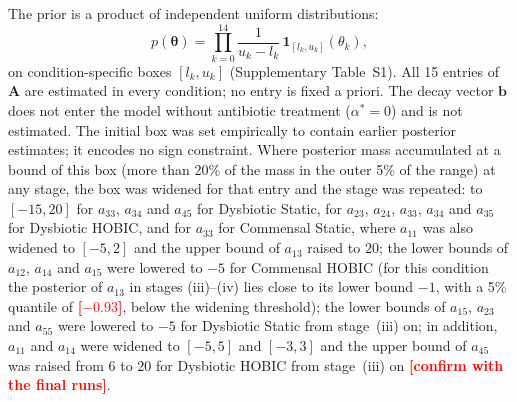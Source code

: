 \documentclass[pdflatex,sn-mathphys-ay,lineno]{sn-jnl}%
\newcommand{\btheta}{\boldsymbol{\theta}}
\newcommand{\TBD}[1]{\textcolor{red}{\textbf{[#1]}}}
\begin{document}
The prior is a product of independent uniform distributions:
\begin{equation}
p(\btheta) = \prod_{k=0}^{14} \frac{1}{u_k-l_k}\,\mathbf{1}_{[l_k,u_k]}(\theta_k),
\label{eq:prior}
\end{equation}
on condition-specific boxes $[l_k,u_k]$ (Supplementary Table~S1).
All 15 entries of $\mathbf{A}$ are estimated in every condition; no entry is fixed a priori.
The decay vector $\mathbf{b}$ does not enter the model without antibiotic treatment ($\alpha^*=0$) and is not estimated.
The initial box was set empirically to contain earlier posterior estimates; it encodes no sign constraint. Where posterior mass accumulated at a bound of this box (more than 20\% of the mass in the outer 5\% of the range) at any stage, the box was widened for that entry and the stage was repeated: to $[-15,20]$ for $a_{33}$, $a_{34}$ and $a_{45}$ for Dysbiotic Static, for $a_{23}$, $a_{24}$, $a_{33}$, $a_{34}$ and $a_{35}$ for Dysbiotic HOBIC, and for $a_{33}$ for Commensal Static, where $a_{11}$ was also widened to $[-5,2]$ and the upper bound of $a_{13}$ raised to $20$; the lower bounds of $a_{12}$, $a_{14}$ and $a_{15}$ were lowered to $-5$ for Commensal HOBIC (for this condition the posterior of $a_{13}$ in stages (iii)--(iv) lies close to its lower bound $-1$, with a 5\% quantile of \TBD{$-0.93$}, below the widening threshold); the lower bounds of $a_{15}$, $a_{23}$ and $a_{55}$ were lowered to $-5$ for Dysbiotic Static from stage~(iii) on; in addition, $a_{11}$ and $a_{14}$ were widened to $[-5,5]$ and $[-3,3]$ and the upper bound of $a_{45}$ was raised from $6$ to $20$ for Dysbiotic HOBIC from stage~(iii) on \TBD{confirm with the final runs}.
\end{document}

